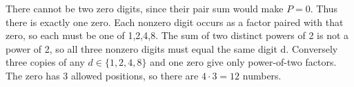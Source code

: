There cannot be two zero digits, since their pair sum would make $P=0$. Thus there is exactly one zero. Each nonzero digit occurs as a factor paired with that zero, so each must be one of 1,2,4,8. The sum of two distinct powers of 2 is not a power of 2, so all three nonzero digits must equal the same digit d. Conversely three copies of any $d\in\{1,2,4,8\}$ and one zero give only power-of-two factors. The zero has 3 allowed positions, so there are $4\cdot 3=\boxed{12}$ numbers.

